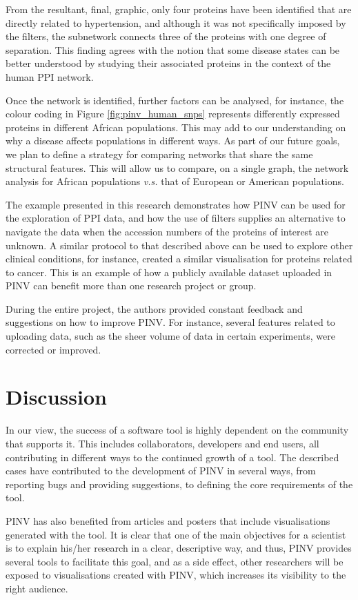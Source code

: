 From the resultant, final, graphic, only four proteins have been identified that are directly related to hypertension, and although it was not specifically imposed by the filters, the subnetwork connects three of the proteins with one degree of separation. This finding agrees with the notion that some disease states can be better understood by studying their associated proteins in the context of the human PPI network.

Once the network is identified, further factors can be analysed, for instance, the colour coding in Figure \ref{fig:pinv_human_snps} represents differently expressed proteins in different African populations. This may add to our understanding on why a disease affects populations in different ways. As part of our future goals, we plan to define a strategy for comparing networks that share the same structural features. This will allow us to compare, on a single graph, the network analysis for African populations \emph{v.s.} that of European or American populations. 

The example presented in this research demonstrates how PINV can be used for the exploration of PPI data, and how the use of filters supplies an alternative to navigate the data when the accession numbers of the proteins of interest are unknown. A similar protocol to that described above can be used to explore other clinical conditions, for instance, \cite{HEE2014} created a similar visualisation for proteins related to cancer. This is an example of how a publicly available dataset uploaded in PINV can benefit more than one research project or group.

During the entire project, the authors provided constant feedback and suggestions on how to improve PINV. For instance, several features related to uploading data, such as the sheer volume of data in certain experiments, were corrected or improved.

\section{Discussion}
In our view, the success of a software tool is highly dependent on the community that supports it.  This includes collaborators, developers and end users, all contributing in different ways to the continued growth of a tool. The described cases have contributed to the development of PINV in several ways, from reporting bugs and providing suggestions, to defining the core requirements of the tool. 

PINV has also benefited from articles and posters that include visualisations generated with the tool. It is clear that one of the main objectives for  a scientist is to explain his/her research in a clear, descriptive way, and thus, PINV provides several tools to facilitate this goal, and as a side effect, other researchers will be exposed to visualisations created with PINV, which increases its visibility to the right audience. 


